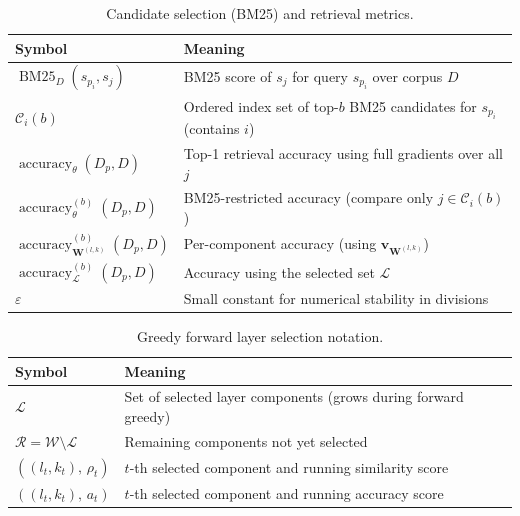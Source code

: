 \begin{table}[htb!]
    \centering
    \small
    \begin{tabular}{ll}
        \textbf{Symbol} & \textbf{Meaning} \\
        \hline
        $\operatorname{BM25}_D(s_{p_i}, s_j)$ & BM25 score of $s_j$ for query $s_{p_i}$ over corpus $D$ \\
        $\mathcal{C}_i(b)$ & Ordered index set of top-$b$ BM25 candidates for $s_{p_i}$ (contains $i$) \\
        $\operatorname{accuracy}_{\theta}(D_p,D)$ & Top-1 retrieval accuracy using full gradients over all $j$ \\
        $\operatorname{accuracy}^{(b)}_{\theta}(D_p,D)$ & BM25-restricted accuracy (compare only $j\in\mathcal{C}_i(b)$) \\
        $\operatorname{accuracy}^{(b)}_{\mathbf{W}^{(l,k)}}(D_p,D)$ & Per-component accuracy (using $\mathbf{v}_{\mathbf{W}^{(l,k)}}$) \\
        $\operatorname{accuracy}^{(b)}_{\mathcal{L}}(D_p,D)$ & Accuracy using the selected set $\mathcal{L}$ \\
        $\varepsilon$ & Small constant for numerical stability in divisions \\
    \end{tabular}
    \caption{Candidate selection (BM25) and retrieval metrics.}
    \label{tab:nomenclature-bm25-metrics}
\end{table}

\begin{table}[htb!]
    \centering
    \small
    \begin{tabular}{ll}
        \textbf{Symbol} & \textbf{Meaning} \\
        \hline
        $\mathcal{L}$ & Set of selected layer components (grows during forward greedy) \\
        $\mathcal{R}=\mathcal{W}\setminus\mathcal{L}$ & Remaining components not yet selected \\
        $((l_t,k_t),\,\rho_t)$ & $t$-th selected component and running similarity score \\
        $((l_t,k_t),\,a_t)$ & $t$-th selected component and running accuracy score \\
    \end{tabular}
    \caption{Greedy forward layer selection notation.}
    \label{tab:nomenclature-greedy}
\end{table}


